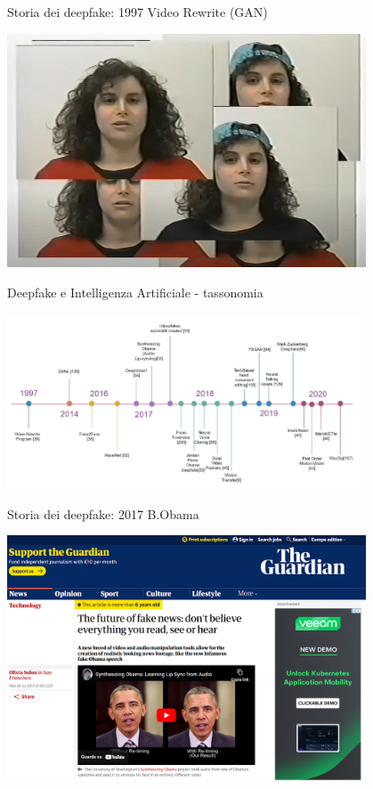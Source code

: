 \documentclass[11pt]{beamer}
\begin{document}
\begin{frame}{Storia dei deepfake: 1997 Video Rewrite (GAN) \cite{video_rewrite}}

\begin{center}
\includegraphics[width=0.8\textwidth]{Pic/video_rewrite.png}
\end{center}

\end{frame}


\begin{frame}{Deepfake e Intelligenza Artificiale - tassonomia \cite{masood2023deepfakes}}

\begin{center}
\includegraphics[width=0.8\textwidth]{Pic/timeline_deepfakes.png}
\end{center}

\end{frame}


\begin{frame}{Storia dei deepfake: 2017 B.Obama \cite{reuters_fake}}

\begin{center}
\includegraphics[width=0.8\textwidth]{Pic/guardian_obama.png}
\end{center}

\end{frame}
\end{document}
